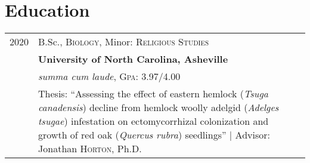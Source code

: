 \section{Education}

\setlength{\arrayrulewidth}{.01pt}
\setlength{\tabcolsep}{8pt}
    
\begin{tabular}{r|p{16cm}}	
    \textsc 2020 & B.Sc., \textsc{Biology}, Minor: \textsc{Religious Studies} \\
    & \textbf{University of North Carolina, Asheville} \\
    & \small\emph{summa cum laude}, \normalsize \textsc{Gpa}: 3.97/4.00 \\
    & Thesis: ``Assessing the effect of eastern hemlock (\textit{Tsuga canadensis}) decline from hemlock woolly adelgid (\textit{Adelges tsugae}) infestation on ectomycorrhizal colonization and growth of red oak (\textit{Quercus rubra}) seedlings'' {\hfill| \small Advisor: Jonathan \textsc{Horton}, Ph.D.}\\

\end{tabular}